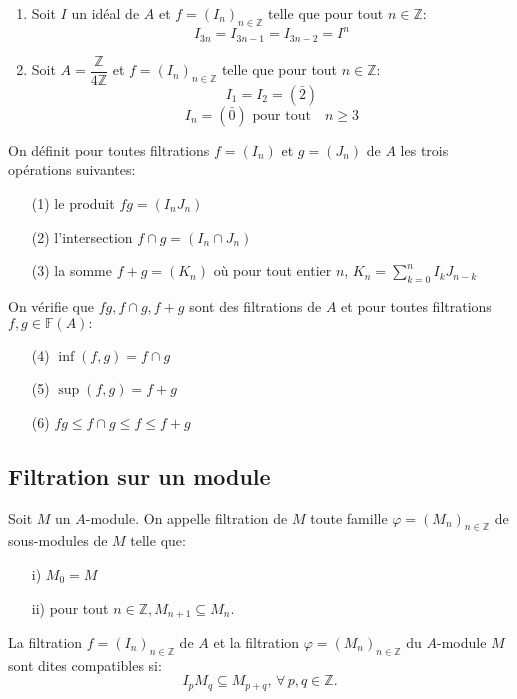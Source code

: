 \begin{monexemple}
	\begin{enumerate}
		\item 	Soit $I$ un idéal de $A$ et $f=(I_n)_{n \in \mathbb{Z}}$ telle que pour tout $n \in \mathbb{Z}$:
		$$I_{3n} = I_{3n-1} = I_{3n-2} =I^{n} $$
		\item 	Soit $A = \dfrac{\mathbb{Z}}{4 \mathbb{Z}} $ et $f=(I_n)_{n \in \mathbb{Z}}$ telle que pour tout $n \in \mathbb{Z}$:
		$$I_1 = I_2 = (\bar{2})$$
		$$I_n = (\bar{0})  \text{ pour tout} \quad n \geqslant 3 $$
	\end{enumerate}
\end{monexemple}
\begin{madefinition}
	On définit pour toutes filtrations $f=(I_n)$ et $g=(J_n)$ de $A$ les trois opérations suivantes: 
	\begin{enumerate}
		\item[(1)] le produit $fg=(I_nJ_n)$
		\item[(2)] l'intersection $f \cap g = (I_n \cap J_n)$
		\item[(3)] la somme $f+g=(K_n)$ où pour tout entier $n$, $K_n =\displaystyle  \sum_{k=0}^{n}I_{k}J_{n-k} $
	\end{enumerate}
	On vérifie que $fg, f \cap g , f + g$ sont des filtrations de $A$ et pour toutes filtrations \\ $f,g \in \mathbb{F}(A):$
		\begin{enumerate}
		\item[(4)] $\inf (f,g) = f \cap g$
		\item[(5)] $\sup (f,g) = f+g $
		\item[(6)] $fg \leqslant f \cap g \leqslant f \leqslant f+g$
	\end{enumerate}
\end{madefinition}

\subsection{Filtration sur un module}
\begin{madefinition}
	Soit $M$ un $A$-module. On appelle filtration de $M$ toute famille $\varphi = (M_n)_{n \in \mathbb{Z}}$ de sous-modules de $M$ telle que:\\
	\begin{enumerate}
		\item[i)] $M_0 = M$ \\
		\item[ii)] pour tout $n \in \mathbb{Z}, M_{n+1} \subseteq M_n$.\\
	\end{enumerate}
	
	La filtration $f = (I_n)_{n \in \mathbb{Z}}$ de $A$ et la filtration $\varphi = (M_n)_{n \in \mathbb{Z}}$ du $A$-module $M$ sont dites compatibles si:
	\[ I_p M_q \subseteq M_{p+q} ,\, \forall \, p, q \in \mathbb{Z}. \]
\end{madefinition}
